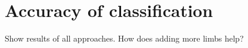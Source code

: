 \section{Accuracy of classification}
Show results of all approaches.
How does adding more limbs help?